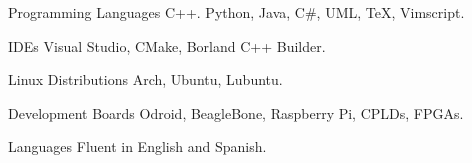 
\begin{cvskills}


	\cvskill
		{Programming Languages}
			{C++. Python, Java, C\#, UML, \TeX, Vimscript.}

	\cvskill
		{IDEs}
			{Visual Studio, CMake, Borland C++ Builder.}

	\cvskill
		{Linux Distributions}
			{Arch, Ubuntu, Lubuntu.}

	\cvskill
		{Development Boards}
			{Odroid, BeagleBone, Raspberry Pi, CPLDs, FPGAs.}


	\cvskill
		{Languages}
			{Fluent in English and Spanish.}

\end{cvskills}
